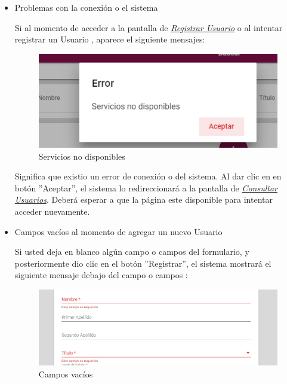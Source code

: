                 \begin{itemize}
                    \item Problemas con la conexión o el sistema
                
                        Si al momento de acceder a la pantalla de \hyperlink{registrarUs}{\textit{Registrar Usuario}} o al intentar registrar un Usuario , aparece el siguiente mensajes:
                        
                        \begin{figure}[!hbtp]
                      	\centering
                      	\includegraphics[width=0.4\linewidth]{images/SP5/MSGSN}
                      	\caption{Servicios no disponibles}
                      	\label{SND}
                     
                      \end{figure}
                    
                        Significa que existio un error de conexión o del sistema. Al dar clic en en botón ''Aceptar'', el sistema lo redireccionará a la pantalla de \hyperlink{consultaUs}{\textit{Consultar Usuarios}}. Deberá esperar a que la página este disponible para  intentar acceder nuevamente.
                    
                    \item Campos vacíos al momento de agregar un nuevo Usuario
                
                        Si usted deja en blanco algún campo o campos del formulario, y posteriormente dio clic en el botón ''Registrar'', el sistema mostrará el siguiente mensaje debajo del campo o campos :
                        	
                         \begin{figure}[!hbtp]
                        	\centering
                        \includegraphics[width=0.4\linewidth]{images/SP5/MSG44}
                        	\caption{Campos vacíos}
                        \label{mensaje44}
                       \end{figure}
                    

\end{itemize}
